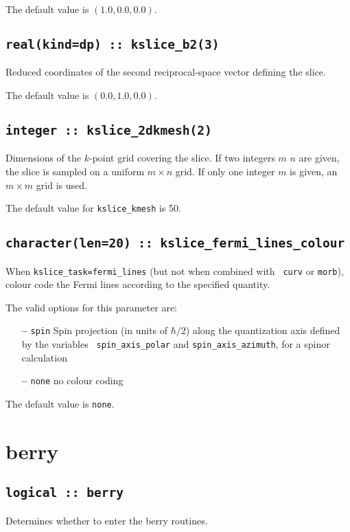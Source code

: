 The default value is $(1.0,0.0,0.0)$.

\subsection[kslice\_corner]{\tt real(kind=dp) :: kslice\_b2(3)}
Reduced coordinates of the second reciprocal-space vector 
defining the slice.

The default value is $(0.0,1.0,0.0)$.

\subsection[kslice\_num\_points]{\tt integer :: kslice\_2dkmesh(2)}

Dimensions of the $k$-point grid covering the slice.
If two integers $m$ $n$ are given, the slice is sampled on a uniform
$m\times n$ grid.  If only one integer $m$ is given, an $m\times m$
grid is used.

The default value for \verb#kslice_kmesh# is 50.


\subsection[kpath\_colour]{\tt character(len=20) ::
  kslice\_fermi\_lines\_colour}
When {\tt kslice\_task=fermi\_lines} (but not when combined with {\tt
  curv} or {\tt morb}), colour code the Fermi lines according to the
specified quantity.

The valid options for this parameter are:
\begin{itemize}
\item[{\bf --}] \verb#spin# Spin projection (in units of $\hbar/2$)
  along the quantization axis defined by the variables {\tt
    spin\_axis\_polar} and {\tt spin\_axis\_azimuth}, for a spinor
  calculation
\item[{\bf --}]  \verb#none# no colour coding
\end{itemize}

The default value is {\tt none}.


\clearpage
\section{berry}

\subsection[berry]{\tt logical :: berry}
Determines whether to enter the berry routines.

